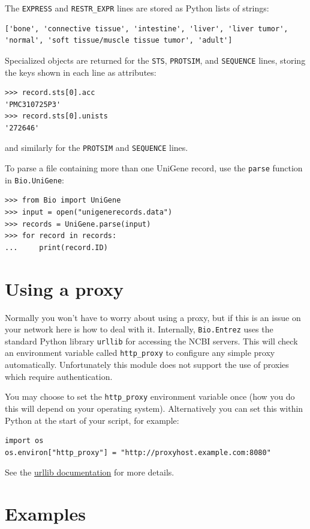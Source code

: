 \documentclass{report}
\begin{document}
The \verb+EXPRESS+ and \verb+RESTR_EXPR+ lines are stored as Python lists of strings:
\begin{verbatim}
['bone', 'connective tissue', 'intestine', 'liver', 'liver tumor', 'normal', 'soft tissue/muscle tissue tumor', 'adult']
\end{verbatim}

Specialized objects are returned for the \verb+STS+, \verb+PROTSIM+, and \verb+SEQUENCE+ lines, storing the keys shown in each line as attributes:
\begin{verbatim}
>>> record.sts[0].acc
'PMC310725P3'
>>> record.sts[0].unists
'272646'
\end{verbatim}
and similarly for the \verb+PROTSIM+ and \verb+SEQUENCE+ lines.

To parse a file containing more than one UniGene record, use the \verb+parse+ function in \verb+Bio.UniGene+:

\begin{verbatim}
>>> from Bio import UniGene
>>> input = open("unigenerecords.data")
>>> records = UniGene.parse(input)
>>> for record in records:
...     print(record.ID)
\end{verbatim}

\section{Using a proxy}

Normally you won't have to worry about using a proxy, but if this is an issue
on your network here is how to deal with it.  Internally, \verb|Bio.Entrez|
uses the standard Python library \verb|urllib| for accessing the NCBI servers.
This will check an environment variable called \verb|http_proxy| to configure
any simple proxy automatically.  Unfortunately this module does not support
the use of proxies which require authentication.

You may choose to set the \verb|http_proxy| environment variable once (how you
do this will depend on your operating system).  Alternatively you can set this
within Python at the start of your script, for example:

\begin{verbatim}
import os
os.environ["http_proxy"] = "http://proxyhost.example.com:8080"
\end{verbatim}

\noindent See the \href{http://www.python.org/doc/lib/module-urllib.html}
{urllib documentation} for more details.

\section{Examples}
\label{sec:entrez_examples}
\end{document}
